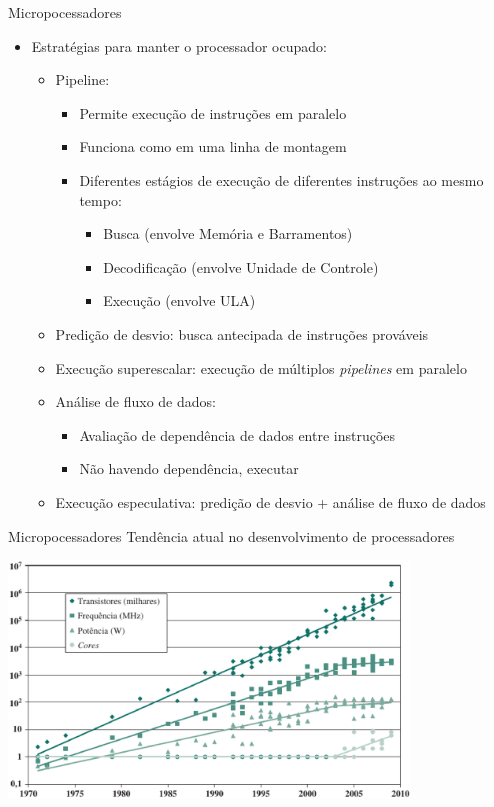 \begin{slide}[toc=]{Micropocessadores}
	\begin{itemize}
		\item Estratégias para manter o processador ocupado:\pause
			\begin{itemize}
				\item Pipeline: 
					\begin{itemize}
      						\item Permite execução de instruções em paralelo
						\item Funciona como em uma linha de montagem
						\item Diferentes estágios de execução de diferentes instruções ao mesmo tempo:\pause
							\begin{itemize}
								\item Busca (envolve Memória e Barramentos)
								\item Decodificação (envolve Unidade de Controle)
								\item Execução (envolve ULA)\pause
							\end{itemize}
					\end{itemize}
				\item Predição de desvio: busca antecipada de instruções prováveis \pause
				\item Execução superescalar: execução de múltiplos \textit{pipelines} em paralelo\pause
				\item Análise de fluxo de dados: 
					\begin{itemize}
						\item Avaliação de dependência de dados entre instruções
						\item Não havendo dependência, executar\pause
					\end{itemize}
				\item Execução especulativa: predição de desvio + análise de fluxo de dados
			\end{itemize}
	\end{itemize}
\end{slide}

\begin{slide}[toc=]{Micropocessadores}
	Tendência atual no desenvolvimento de processadores
	\begin{center}
		\includegraphics[width = 0.8\textwidth]{figs/tendencia}
	\end{center}
\end{slide}

